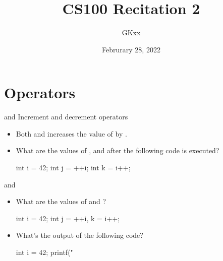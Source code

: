 \documentclass[handout]{beamer}
\title{CS100 Recitation 2}
\author{GKxx}
\date{Februrary 28, 2022}
\begin{document}
\begin{frame}
    \maketitle
\end{frame}


\section{Operators}

\begin{frame}[fragile]{\ttt{++} and \ttt{--}}
    Increment and decrement operators
    \begin{itemize}
        \item Both  and  increases the value of  by .
        \pause
        \item What are the values of ,  and  after the following code is executed?
        \begin{cpp}
int i = 42;
int j = ++i;
int k = i++;
        \end{cpp}
        \pause
    \end{itemize}
\end{frame}

\begin{frame}[fragile]{\ttt{++} and \ttt{--}}
    \begin{itemize}
        \item What are the values of  and ?
        \begin{cpp}
int i = 42;
int j = ++i, k = i++;
        \end{cpp}
        \pause
        \pause
        \item What's the output of the following code?
        \begin{cpp}
int i = 42;
printf("%
        \end{cpp}
        \pause
    \end{itemize}
\end{frame}
\end{document}

